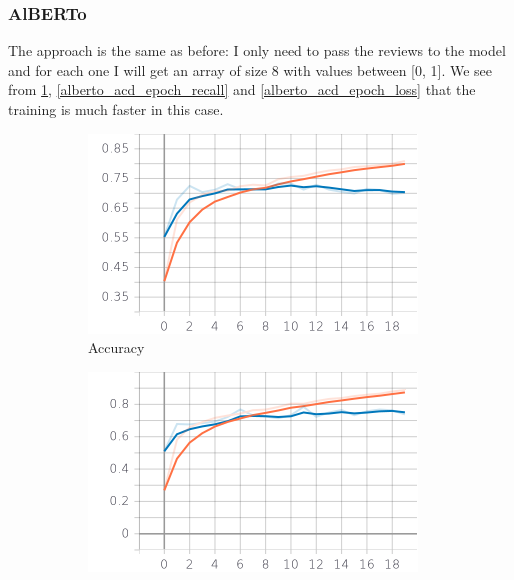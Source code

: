 \documentclass{article}
\begin{document}
            \subsubsection{AlBERTo}
                The approach is the same as before: I only need to pass the reviews to the model and for each one I will get an array of size 8 with values between [0, 1].
                We see from  \ref{alberto_acd_epoch_accuracy}, \ref{alberto_acd_epoch_recall} and \ref{alberto_acd_epoch_loss} that the training is much faster in this case.
            \begin{figure}
		    \centering
		        \begin{subfigure}{.33\textwidth}
  		            \centering
 		            \includegraphics[width=\textwidth]{imgs/plots/alberto_acd_epoch_accuracy.png}
  		            \caption{Accuracy}
  		            \label{alberto_acd_epoch_accuracy}
		        \end{subfigure}%
                \begin{subfigure}{.33\textwidth}
 		            \centering
 		            \includegraphics[width=\textwidth]{imgs/plots/alberto_acd_epoch_recall.png}

\end{subfigure}
\end{figure}
\end{document}
